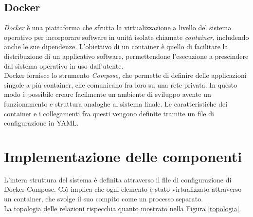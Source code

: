 \subsection{Docker}
\textit{Docker} è una piattaforma che sfrutta la virtualizzazione a livello del sistema operativo per incorporare software 
in unità isolate chiamate \textit{container}, includendo anche le sue dipendenze. L'obiettivo di un container è quello di 
facilitare la distribuzione di un applicativo software, permettendone l'esecuzione a prescindere dal sistema operativo 
in uso dall'utente. 
\\ Docker fornisce lo strumento \textit{Compose}, che permette di definire delle applicazioni singole a più container, 
che comunicano fra loro su una rete privata. In questo modo è possibile creare facilmente un ambiente di sviluppo avente 
un funzionamento e struttura analoghe al sistema finale. Le caratteristiche dei container e i collegamenti fra questi vengono definite tramite un file di configurazione in YAML. 


\section{Implementazione delle componenti}
L'intera struttura del sistema è definita attraverso il file di configurazione di Docker Compose. Ciò implica che ogni 
elemento è stato virtualizzato attraverso un container, che svolge il suo compito come un processo separato. 
\\ La topologia delle relazioni rispecchia quanto mostrato nella Figura \ref*{topologia}. 


